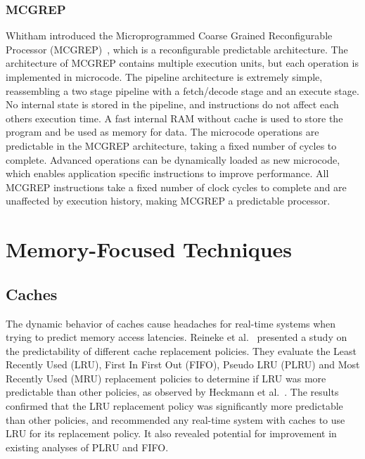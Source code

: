 \subsubsection{MCGREP}
Whitham introduced the Microprogrammed Coarse Grained Reconfigurable Processor (MCGREP)~\cite{whitam:06:mcgrep}, which is a reconfigurable predictable architecture.
The architecture of MCGREP contains multiple execution units, but each operation is implemented in microcode. 
The pipeline architecture is extremely simple, reassembling a two stage pipeline with a fetch/decode stage and an execute stage.
No internal state is stored in the pipeline, and instructions do not affect each others execution time. 
A fast internal RAM without cache is used to store the program and be used as memory for data.    
The microcode operations are predictable in the MCGREP architecture, taking a fixed number of cycles to complete.
Advanced operations can be dynamically loaded as new microcode, which enables application specific instructions to improve performance.
All MCGREP instructions take a fixed number of clock cycles to complete and are unaffected by execution history, making MCGREP a predictable processor. 


\section{Memory-Focused Techniques}
\subsection{Caches}
The dynamic behavior of caches cause headaches for real-time systems when trying to predict memory access latencies.
Reineke et al.~\cite{Reineke07TimingPredictability} presented a study on the predictability of different cache replacement policies.
They evaluate the Least Recently Used (LRU), First In First Out (FIFO), Pseudo LRU (PLRU) and Most Recently Used (MRU) replacement policies to determine if LRU was more predictable than other policies, as observed by Heckmann et al.~\cite{Heckmann2003processor}.    
The results confirmed that the LRU replacement policy was significantly more predictable than other policies, and recommended any real-time system with caches to use LRU for its replacement policy. 
It also revealed potential for improvement in existing analyses of PLRU and FIFO.

